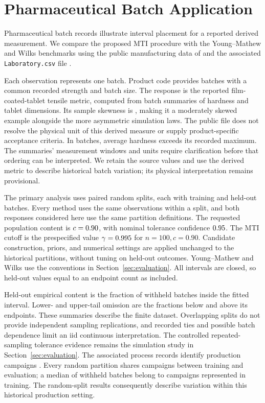 \documentclass[11pt]{article}
\numberwithin{equation}{section}
\begin{document}
\section{Pharmaceutical Batch Application}
\label{sec:pharma-application}


Pharmaceutical batch records illustrate interval placement for a reported
derived measurement. We compare the proposed MTI procedure with
the Young--Mathew and Wilks benchmarks using the public manufacturing data of
\citet{ZagarMihelic2022PharmaManufacturing} and the associated
\texttt{Laboratory.csv} file \citep{ZagarMihelic2021LaboratoryCsv}.

Each observation represents one batch. Product code \PharmaProductCode{}
provides \PharmaBatches{} batches with a common recorded strength and batch
size. The response is the reported film-coated-tablet tensile metric,
computed from batch summaries of hardness and tablet dimensions.
Its sample skewness is \PharmaTensileSkewness{}, making it a
moderately skewed example alongside the more asymmetric simulation laws.
The public file does not resolve the physical unit of this derived measure
or supply product-specific acceptance criteria. In
\PharmaFctHardnessQuestions{} batches, average hardness exceeds its recorded
maximum. The summaries' measurement windows and units require clarification
before that ordering can be interpreted. We retain the source values and
use the derived metric to describe historical batch variation; its physical
interpretation remains provisional.

The primary analysis uses \PharmaSplits{} paired random splits, each with
\PharmaTrain{} training and \PharmaHeldout{} held-out batches. Every method
uses the same observations within a split, and both responses considered here
use the same partition definitions. The requested population content is
\(c=0.90\), with nominal tolerance confidence
\(0.95\). The MTI cutoff is the prespecified value
\(\gamma=0.995\) for \(n=100,c=0.90\). Candidate construction,
priors, and numerical settings are applied unchanged to the historical
partitions, without tuning on held-out outcomes. Young--Mathew and Wilks use the conventions in
Section~\ref{sec:evaluation}. All intervals are closed, so held-out values
equal to an endpoint count as included.

Held-out empirical content is the fraction of withheld batches inside the
fitted interval. Lower- and upper-tail omission are the fractions below and
above its endpoints. These summaries describe the finite dataset. Overlapping
splits do not provide independent sampling replications, and recorded ties
and possible batch dependence limit an iid continuous interpretation.
The controlled repeated-sampling tolerance evidence remains the simulation
study in Section~\ref{sec:evaluation}.
The associated process records identify \PharmaCampaigns{} production
campaigns \citep{ZagarMihelic2021Process}. Every random partition shares
campaigns between training and evaluation; a median
\PharmaRandomSharedHeldout{} of \PharmaHeldout{} withheld batches belong to
campaigns represented in training. The random-split results consequently
describe variation within this historical production setting.
\end{document}
